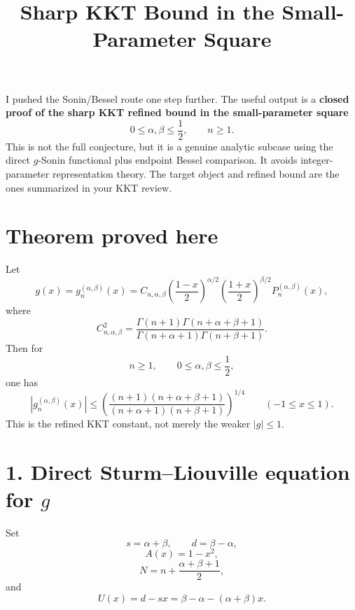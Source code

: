 \documentclass[11pt]{article}
\title{Sharp KKT Bound in the Small-Parameter Square}
\author{}
\date{}
\begin{document}
\maketitle
I pushed the Sonin/Bessel route one step further. The useful output is a \textbf{closed proof of the sharp KKT refined bound in the small-parameter square}
\begin{equation*}
0\le \alpha,\beta\le \frac12,\qquad n\ge1.
\end{equation*}
This is not the full conjecture, but it is a genuine analytic subcase using the direct \(g\)-Sonin functional plus endpoint Bessel comparison. It avoids integer-parameter representation theory. The target object and refined bound are the ones summarized in your KKT review.

\section*{Theorem proved here}

Let
\begin{equation*}
g(x)=g_n^{(\alpha,\beta)}(x)
=
C_{n,\alpha,\beta}
\left(\frac{1-x}{2}\right)^{\alpha/2}
\left(\frac{1+x}{2}\right)^{\beta/2}
P_n^{(\alpha,\beta)}(x),
\end{equation*}
where
\begin{equation*}
C_{n,\alpha,\beta}^2
=
\frac{\Gamma(n+1)\Gamma(n+\alpha+\beta+1)}
{\Gamma(n+\alpha+1)\Gamma(n+\beta+1)}.
\end{equation*}
Then for
\begin{equation*}
n\ge1,\qquad 0\le\alpha,\beta\le\frac12,
\end{equation*}
one has
\begin{equation*}
\boxed{
|g_n^{(\alpha,\beta)}(x)|
\le
\left(
\frac{(n+1)(n+\alpha+\beta+1)}
{(n+\alpha+1)(n+\beta+1)}
\right)^{1/4}
}
\qquad (-1\le x\le1).
\end{equation*}
This is the refined KKT constant, not merely the weaker \(|g|\le1\).

\section*{1. Direct Sturm--Liouville equation for \(g\)}

Set
\begin{equation*}
s=\alpha+\beta,\qquad d=\beta-\alpha,
\end{equation*}
\begin{equation*}
A(x)=1-x^2,
\end{equation*}
\begin{equation*}
N=n+\frac{\alpha+\beta+1}{2},
\end{equation*}
and
\begin{equation*}
U(x)=d-sx=\beta-\alpha-(\alpha+\beta)x.
\end{equation*}
\end{document}

